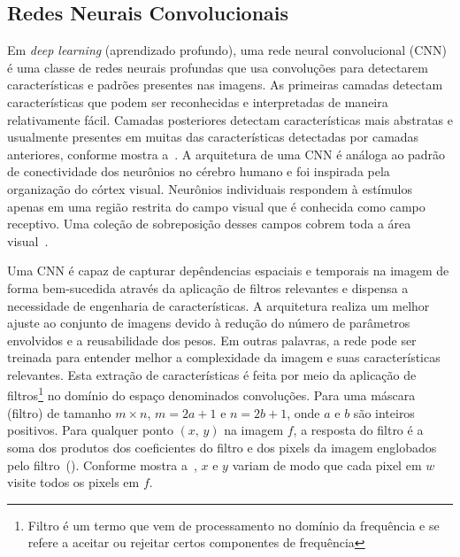 \subsection{Redes Neurais Convolucionais}
Em \textit{deep learning} (aprendizado profundo), uma rede neural convolucional (\acrshort{CNN})~\cite{lecun2010convolutional} é uma classe de redes neurais profundas que usa convoluções para detectarem características e padrões presentes nas imagens. As primeiras camadas detectam características que podem ser reconhecidas e interpretadas de maneira relativamente fácil. Camadas posteriores detectam características mais abstratas e usualmente presentes em muitas das características detectadas por camadas anteriores, conforme mostra a~. A arquitetura de uma \acrshort{CNN} é análoga ao padrão de conectividade dos neurônios no cérebro humano e foi inspirada pela organização do córtex visual. Neurônios individuais respondem à estímulos apenas em uma região restrita do campo visual que é conhecida como campo receptivo. Uma coleção de sobreposição desses campos cobrem toda a área visual~\cite{livrodl}.


Uma \acrshort{CNN} é capaz de capturar depêndencias espaciais e temporais na imagem de forma bem-sucedida através da aplicação de filtros relevantes e dispensa a necessidade de engenharia de características. A arquitetura realiza um melhor ajuste ao conjunto de imagens devido à redução do número de parâmetros envolvidos e a reusabilidade dos pesos. Em outras palavras, a rede pode ser treinada para entender melhor a complexidade da imagem e suas características relevantes. Esta extração de características é feita por meio da aplicação de filtros\footnote{Filtro é um termo que vem de processamento no domínio da frequência e se refere a aceitar ou rejeitar certos componentes de frequência} no domínio do espaço denominados convoluções. Para uma máscara (filtro) de tamanho $m \times n$, $m = 2a + 1$ e $n = 2b + 1$, onde $a$ e $b$ são inteiros positivos. Para qualquer ponto $(x,\, y)$ na imagem $f$, a resposta do filtro é a soma dos produtos dos coeficientes do filtro e dos pixels da imagem englobados pelo filtro~().
Conforme mostra a~, $x$ e $y$ variam de modo que cada pixel em $w$ visite todos os pixels em $f$.
 